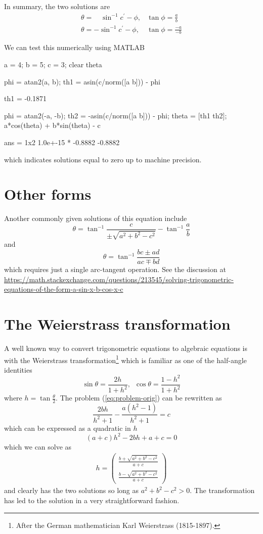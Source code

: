 \documentclass[11pt,a4paper,fleqn]{article}
\begin{document}
In summary, the two solutions are
\[
\begin{array}{ll}
\theta = \hspace{1em}\sin^{-1} c^\prime - \phi, & \tan \phi =  \frac{a}{b} \\
\theta = -\sin^{-1} c^\prime - \phi, & \tan \phi =  \frac{-a}{-b}
\end{array}
\]

We can test this numerically using MATLAB
\begin{matlabcode}
a = 4; b = 5; c = 3;
clear theta

phi = atan2(a, b);
th1 = asin(c/norm([a b])) - phi
\end{matlabcode}
\begin{matlaboutput}
th1 = -0.1871
\end{matlaboutput}
\begin{matlabcode}
phi = atan2(-a, -b);
th2 = -asin(c/norm([a b])) - phi;
theta = [th1 th2];
a*cos(theta) + b*sin(theta) - c
\end{matlabcode}
\begin{matlaboutput}
ans = 1x2    
1.0e+-15 *
   -0.8882   -0.8882
\end{matlaboutput}
which indicates solutions equal to zero up to machine precision.

\section*{Other forms}
Another commonly given solutions of this equation include
\[
\theta = \tan^{-1} \frac{c}{\pm \sqrt{a^2+b^2-c^2}} - \tan^{-1}\frac{a}{b}
\]
and
\[
\theta = \tan^{-1} \frac{ bc \pm ad}{ac \mp bd}
\]
which requires just a single arc-tangent operation.
See the discussion at \url{https://math.stackexchange.com/questions/213545/solving-trigonometric-equations-of-the-form-a-sin-x-b-cos-x-c}


\section*{The Weierstrass transformation}
A well known way to convert trigonometric equations to algebraic equations is with the Weierstrass transformation\footnote{After the German mathematician Karl Weierstrass (1815-1897).} which is familiar as one of the half-angle identities
\[
\sin \theta = \frac{2h}{1+h^2}, \,\,\, \cos \theta = \frac{1-h^2}{1+h^2}
\]
where $h = \tan \frac{\theta}{2}$.  The problem (\ref{eq:problem-orig}) can be rewritten as
\[
\frac{2 b h}{h^2 + 1} - \frac{a (h^2 - 1)}{h^2 + 1} = c
\]
which can be expressed as a quadratic in $h$
\[
(a+c)h^2 - 2bh+a + c = 0
\]
which we can solve as
\begin{align}
h = \left(\begin{array}{c} \frac{b+\sqrt{a^2+b^2-c^2}}{a+c}\\ 
\frac{b-\sqrt{a^2+b^2-c^2}}{a+c} \end{array}\right)
\end{align}
and clearly has the two solutions so long as $a^2 + b^2 - c^2 > 0$. 
The transformation has led to the solution in a very straightforward fashion.
\end{document}
